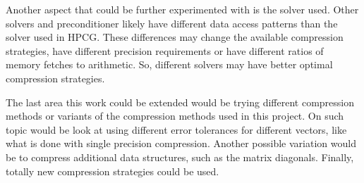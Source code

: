 Another aspect that could be further experimented with is the solver used.
Other solvers and preconditioner likely have different data access patterns than the solver used in HPCG.
These differences may change the available compression strategies, have different precision requirements or have different ratios of memory fetches to arithmetic.
So, different solvers may have better optimal compression strategies.

The last area this work could be extended would be trying different compression methods or variants of the compression methods used in this project.
On such topic would be look at using different error tolerances for different vectors, like what is done with single precision compression.
Another possible variation would be to compress additional data structures, such as the matrix diagonals.
Finally, totally new compression strategies could be used.

